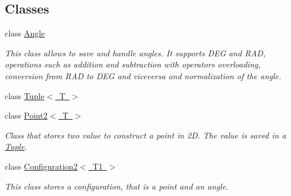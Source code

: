 \subsection*{Classes}
\begin{DoxyCompactItemize}
\item 
class \mbox{\hyperlink{class_angle}{Angle}}
\begin{DoxyCompactList}\small\item\em This class allows to save and handle angles. It supports D\+EG and R\+AD, operations such as addition and subtraction with operators overloading, conversion from R\+AD to D\+EG and viceversa and normalization of the angle. \end{DoxyCompactList}\item 
class \mbox{\hyperlink{class_tuple}{Tuple$<$ T $>$}}
\item 
class \mbox{\hyperlink{class_point2}{Point2$<$ T $>$}}
\begin{DoxyCompactList}\small\item\em Class that stores two value to construct a point in 2D. The value is saved in a \mbox{\hyperlink{class_tuple}{Tuple}}. \end{DoxyCompactList}\item 
class \mbox{\hyperlink{class_configuration2}{Configuration2$<$ T1 $>$}}
\begin{DoxyCompactList}\small\item\em This class stores a configuration, that is a point and an angle. \end{DoxyCompactList}\end{DoxyCompactItemize}
